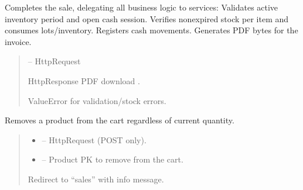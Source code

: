 \documentclass[a4paper,11pt,spanish]{sphinxmanual}
\begin{document}

\begin{fulllineitems}
\label{\detokenize{api/sale/sale.views:sale.views.make_a_sale}}
\pysigstartsignatures
\pysiglinewithargsret
{}
{}
{}
\pysigstopsignatures
\sphinxAtStartPar
Completes the sale, delegating all business logic to services:
\sphinxhyphen{} Validates active inventory period and open cash session.
\sphinxhyphen{} Verifies non\sphinxhyphen{}expired stock per item and consumes lots/inventory.
\sphinxhyphen{} Registers cash movements.
\sphinxhyphen{} Generates PDF bytes for the invoice.
\begin{quote}\begin{description}
\sphinxAtStartPar
{} – HttpRequest

\sphinxAtStartPar
HttpResponse PDF download .

\sphinxAtStartPar
ValueError for validation/stock errors.

\end{description}\end{quote}

\end{fulllineitems}


\begin{fulllineitems}
\label{\detokenize{api/sale/sale.views:sale.views.remove_product_from_cart}}
\pysigstartsignatures
\pysiglinewithargsret
{}
{\sphinxparamcomma {}}
{}
\pysigstopsignatures
\sphinxAtStartPar
Removes a product from the cart regardless of current quantity.
\begin{quote}\begin{description}
\begin{itemize}
\item {} 
\sphinxAtStartPar
{} – HttpRequest (POST only).

\item {} 
\sphinxAtStartPar
{} – Product PK to remove from the cart.

\end{itemize}

\sphinxAtStartPar
Redirect to “sales” with info message.

\end{description}\end{quote}

\end{fulllineitems}
\end{document}
